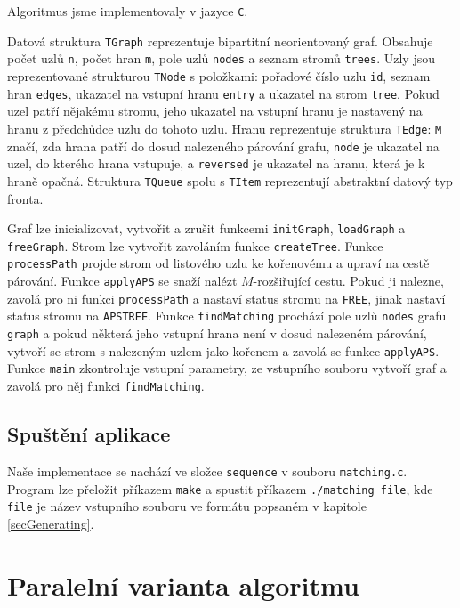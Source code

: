 \documentclass[a4paper, 11pt, titlepage, final]{article}[3. prosinec 2011]
\begin{document}
Algoritmus jsme implementovaly v jazyce \texttt{C}.

Datová struktura \texttt{TGraph} reprezentuje bipartitní neorientovaný graf. Obsahuje počet uzlů \texttt{n}, počet hran \texttt{m}, pole uzlů \texttt{nodes} a seznam stromů \texttt{trees}. Uzly jsou reprezentované strukturou \texttt{TNode} s položkami: pořadové číslo uzlu \texttt{id}, seznam hran \texttt{edges}, ukazatel na vstupní hranu \texttt{entry} a ukazatel na strom \texttt{tree}. Pokud uzel patří nějakému stromu, jeho ukazatel na vstupní hranu je nastavený na hranu z předchůdce uzlu do tohoto uzlu. Hranu reprezentuje struktura \texttt{TEdge}: \texttt{M} značí, zda hrana patří do dosud nalezeného párování grafu, \texttt{node} je ukazatel na uzel, do kterého hrana vstupuje, a \texttt{reversed} je ukazatel na hranu, která je k hraně opačná. Struktura \texttt{TQueue} spolu s \texttt{TItem} reprezentují abstraktní datový typ fronta.

Graf lze inicializovat, vytvořit a zrušit funkcemi \texttt{initGraph}, \texttt{loadGraph} a \texttt{freeGraph}. Strom lze vytvořit zavoláním funkce \texttt{createTree}. Funkce \texttt{processPath} projde strom od listového uzlu ke kořenovému a upraví na cestě párování. Funkce \texttt{applyAPS} se snaží nalézt $M$-rozšiřující cestu. Pokud ji nalezne, zavolá pro ni funkci \texttt{processPath} a nastaví status stromu na \texttt{FREE}, jinak nastaví status stromu na \texttt{APSTREE}. Funkce \texttt{findMatching} prochází pole uzlů \texttt{nodes} grafu \texttt{graph} a pokud některá jeho vstupní hrana není v dosud nalezeném párování, vytvoří se strom s nalezeným uzlem jako kořenem a zavolá se funkce \texttt{applyAPS}. Funkce \texttt{main} zkontroluje vstupní parametry, ze vstupního souboru vytvoří graf a zavolá pro něj funkci \texttt{findMatching}.

\subsection{Spuštění aplikace}

Naše implementace se nachází ve složce \texttt{sequence} v souboru \texttt{matching.c}. Program lze přeložit příkazem \texttt{make} a spustit příkazem \texttt{./matching file}, kde \texttt{file} je název vstupního souboru ve formátu popsaném v kapitole \ref{secGenerating}.

\section{Paralelní varianta algoritmu} \label{secParallel}
\end{document}
